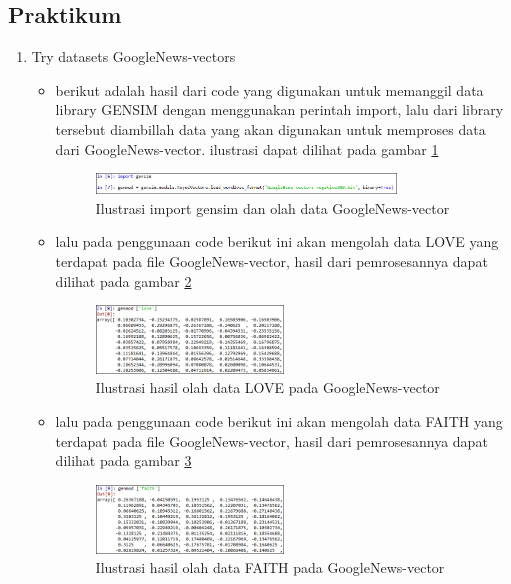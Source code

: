\subsection{Praktikum}
\begin{enumerate}
\item Try datasets GoogleNews-vectors
\begin{itemize}
\item berikut adalah hasil dari code yang digunakan untuk memanggil data library GENSIM dengan menggunakan perintah import, lalu dari library tersebut diambillah data yang akan digunakan untuk memproses data dari GoogleNews-vector. ilustrasi dapat dilihat pada gambar \ref{d7}
\begin{figure}[!htbp]
	\centering
	\includegraphics[width=0.8\textwidth]{figures/fathi/chapter5/hari2/1}
	\caption{Ilustrasi  import gensim dan olah data GoogleNews-vector}
	\label{d7}
\end{figure}

\item lalu pada penggunaan code berikut ini akan mengolah data LOVE yang terdapat pada file GoogleNews-vector, hasil dari pemrosesannya dapat dilihat pada gambar \ref{d8}
\begin{figure}[!htbp]
	\centering
	\includegraphics[width=0.5\textwidth]{figures/fathi/chapter5/hari2/2}
	\caption{Ilustrasi hasil olah data LOVE pada GoogleNews-vector}
	\label{d8}
\end{figure}

\item  lalu pada penggunaan code berikut ini akan mengolah data FAITH yang terdapat pada file GoogleNews-vector, hasil dari pemrosesannya dapat dilihat pada gambar \ref{d9}
\begin{figure}[!htbp]
	\centering
	\includegraphics[width=0.5\textwidth]{figures/fathi/chapter5/hari2/3}
	\caption{Ilustrasi hasil olah data FAITH pada GoogleNews-vector}
	\label{d9}
\end{figure}


\end{itemize}
\end{enumerate}
